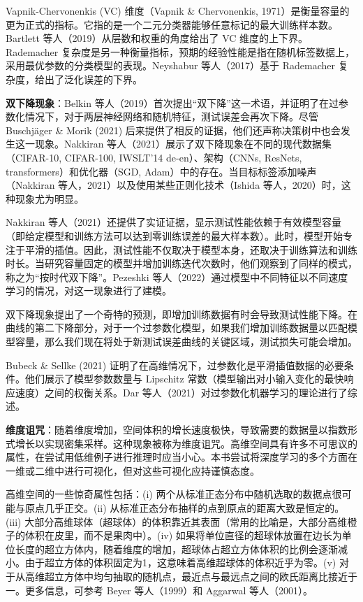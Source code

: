 \documentclass[lang=cn,newtx,10pt,scheme=chinese]{elegantbook}
\begin{document}
Vapnik-Chervonenkis (VC) 维度（Vapnik \& Chervonenkis, 1971）是衡量容量的更为正式的指标。它指的是一个二元分类器能够任意标记的最大训练样本数。Bartlett 等人（2019）从层数和权重的角度给出了 VC 维度的上下界。Rademacher 复杂度是另一种衡量指标，预期的经验性能是指在随机标签数据上，采用最优参数的分类模型的表现。Neyshabur 等人（2017）基于 Rademacher 复杂度，给出了泛化误差的下界。

\textbf{双下降现象}：Belkin 等人（2019）首次提出“双下降”这一术语，并证明了在过参数化情况下，对于两层神经网络和随机特征，测试误差会再次下降。尽管 Buschjäger \& Morik (2021) 后来提供了相反的证据，他们还声称决策树中也会发生这一现象。Nakkiran 等人（2021）展示了双下降现象在不同的现代数据集（CIFAR-10, CIFAR-100, IWSLT’14 de-en）、架构（CNNs, ResNets, transformers）和优化器（SGD, Adam）中的存在。当目标标签添加噪声（Nakkiran 等人，2021）以及使用某些正则化技术（Ishida 等人，2020）时，这种现象尤为明显。

Nakkiran 等人（2021）还提供了实证证据，显示测试性能依赖于有效模型容量（即给定模型和训练方法可以达到零训练误差的最大样本数）。此时，模型开始专注于平滑的插值。因此，测试性能不仅取决于模型本身，还取决于训练算法和训练时长。当研究容量固定的模型并增加训练迭代次数时，他们观察到了同样的模式，称之为“按时代双下降”。Pezeshki 等人（2022）通过模型中不同特征以不同速度学习的情况，对这一现象进行了建模。

双下降现象提出了一个奇特的预测，即增加训练数据有时会导致测试性能下降。在曲线的第二下降部分，对于一个过参数化模型，如果我们增加训练数据量以匹配模型容量，那么我们现在将处于新测试误差曲线的关键区域，测试损失可能会增加。

Bubeck \& Sellke (2021) 证明了在高维情况下，过参数化是平滑插值数据的必要条件。他们展示了模型参数数量与 Lipschitz 常数（模型输出对小输入变化的最快响应速度）之间的权衡关系。Dar 等人（2021）对过参数化机器学习的理论进行了综述。

\textbf{维度诅咒}：随着维度增加，空间体积的增长速度极快，导致需要的数据量以指数形式增长以实现密集采样。这种现象被称为维度诅咒。高维空间具有许多不可思议的属性，在尝试用低维例子进行推理时应当小心。本书尝试将深度学习的多个方面在一维或二维中进行可视化，但对这些可视化应持谨慎态度。

高维空间的一些惊奇属性包括：(i) 两个从标准正态分布中随机选取的数据点很可能与原点几乎正交。(ii) 从标准正态分布抽样的点到原点的距离大致是恒定的。(iii) 大部分高维球体（超球体）的体积靠近其表面（常用的比喻是，大部分高维橙子的体积在皮里，而不是果肉中）。(iv) 如果将单位直径的超球体放置在边长为单位长度的超立方体内，随着维度的增加，超球体占超立方体体积的比例会逐渐减小。由于超立方体的体积固定为1，这意味着高维超球体的体积近乎为零。(v) 对于从高维超立方体中均匀抽取的随机点，最近点与最远点之间的欧氏距离比接近于一。更多信息，可参考 Beyer 等人（1999）和 Aggarwal 等人（2001）。
\end{document}
